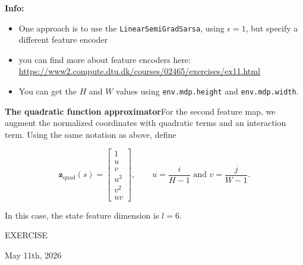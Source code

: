 \documentclass[11pt]{article}
\newcommand{\inlinecode}[1]{\colorbox{gray!15}{\texttt{#1}}}
\begin{document}
\begin{minipage}[t]{0.06\textwidth}
\vspace{0pt}
{\Large{}}
\end{minipage}
\begin{minipage}[t]{0.9\textwidth}
\vspace{0pt}
\textbf{Info:}
\begin{itemize}
\item One approach is to use the \inlinecode{LinearSemiGradSarsa}, using $\epsilon = 1$, but specify a different feature encoder
\item you can find more about feature encoders here: \url{https://www2.compute.dtu.dk/courses/02465/exercises/ex11.html}
\item You can get the $H$ and $W$ values using \inlinecode{env.mdp.height} and \inlinecode{env.mdp.width}.
\end{itemize}
\end{minipage}

\textbf{The quadratic function approximator}\quad For the second feature map, we augment the normalized coordinates with quadratic terms and an interaction term. Using the same notation as above, define

\begin{equation}
\boldsymbol{z}_{\mathrm{quad}}(s)=
\begin{bmatrix}
1\\
u\\
v\\
u^{2}\\
v^{2}\\
uv
\end{bmatrix},
\qquad
u=\frac{i}{H-1}\text{ and }v=\frac{j}{W-1}.
\tag{3}
\end{equation}

In this case, the state feature dimension is $l=6$.

\newpage
\thispagestyle{empty}

\noindent
\begin{minipage}[t]{\textwidth}
  \vspace*{-0.2cm}
  \begin{minipage}[t]{0.5\textwidth}
    \raggedright
    {\large EXERCISE}
  \end{minipage}%
  \begin{minipage}[t]{0.5\textwidth}
    \raggedleft
    {\large May 11th, 2026}
  \end{minipage}
\end{minipage}
\end{document}
